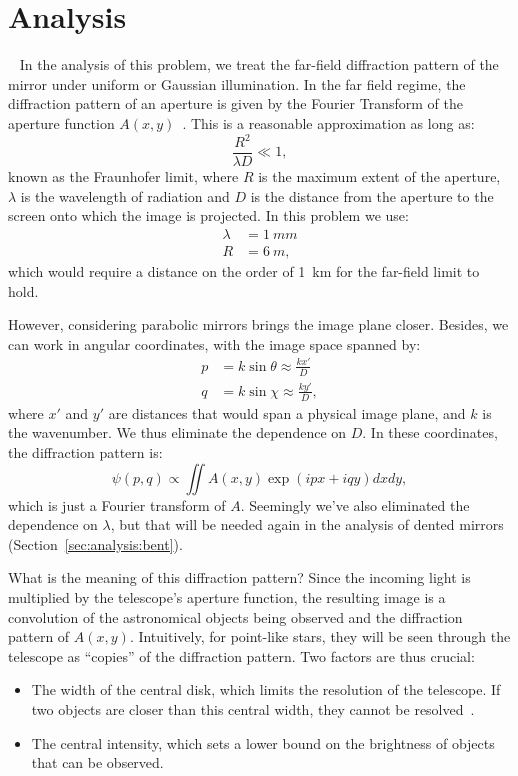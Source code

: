 \documentclass[11pt]{article}
\begin{document}
\section{Analysis}~\label{sec:analysis}
In the analysis of this problem, we treat the far-field diffraction pattern of the mirror under uniform or Gaussian illumination. In the far field regime, the diffraction pattern of an aperture is given by the Fourier Transform of the aperture function \( A(x,y) \)~\cite[Chapter 10.2]{hecht}. This is a reasonable approximation as long as:
\begin{equation}\label{eqn:fraunhofer}
    \frac{R^2}{\lambda D} \ll 1,
\end{equation}
known as the Fraunhofer limit, where $R$ is the maximum extent of the aperture, $\lambda$ is the wavelength of radiation and $D$ is the distance from the aperture to the screen onto which the image is projected. In this problem we use:
\begin{align*}
    \lambda &= \SI{1}{mm} \\
    R &= \SI{6}{m},
\end{align*}
which would require a distance on the order of \SI{1}{km} for the far-field limit to hold. 

However, considering parabolic mirrors brings the image plane closer. Besides, we can work in angular coordinates, with the image space spanned by:
\begin{align*}
    p &= k \sin{\theta} \approx \frac{k x'}{D} \\
    q &= k \sin{\chi} \approx \frac{k y'}{D},
\end{align*}
where $x'$ and $y'$ are distances that would span a physical image plane, and $k$ is the wavenumber. We thus eliminate the dependence on $D$. In these coordinates, the diffraction pattern is:
\begin{equation}\label{eqn:diff}
    \psi(p, q) \propto \iint A(x, y) \exp \left( ipx + iqy \right) dx dy,
\end{equation}
which is just a Fourier transform of $A$. Seemingly we've also eliminated the dependence on $\lambda$, but that will be needed again in the analysis of dented mirrors (Section~\ref{sec:analysis:bent}).

What is the meaning of this diffraction pattern? Since the incoming light is multiplied by the telescope's aperture function, the resulting image is a convolution of the astronomical objects being observed and the diffraction pattern of $A(x, y)$. Intuitively, for point-like stars, they will be seen through the telescope as ``copies'' of the diffraction pattern. Two factors are thus crucial:
\begin{itemize}
    \item The width of the central disk, which limits the resolution of the telescope. If two objects are closer than this central width, they cannot be resolved~\cite[Section~10.2.6]{hecht}.
    \item The central intensity, which sets a lower bound on the brightness of objects that can be observed.
\end{itemize}
\end{document}

